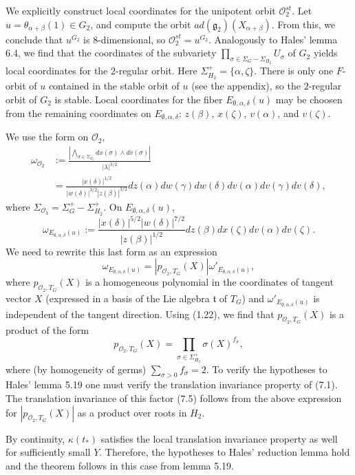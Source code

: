 \documentclass[12pt,letterpaper]{amsart}
\begin{document}
We explicitly construct
local coordinates for the unipotent orbit ${\mathcal O}_2^{st}$.
Let $u=\theta_{\alpha+\beta }(1)\in G_2$, and compute
the orbit $ad({\mathfrak g}_2)(X_{\alpha+\beta })$.
From this, we conclude that $u^{G_2}$
is 8-dimensional, so ${\mathcal O}_2^{st}=u^{G_2}$.
Analogously to Hales' lemma 6.4,
we find that the coordinates of the subvariety
$\prod_{\sigma\in \Sigma_G-\Sigma_{H_2}}U_\sigma$
of $G_2$ yields local coordinates for the $2$-regular orbit.
Here $\Sigma_{H_2}^+=\{\alpha,\zeta\}$.
There is only one $F$-orbit of $u$ contained in the stable orbit of $u$
(see the appendix), so the $2$-regular orbit of $G_2$ is stable.
Local coordinates for the fiber $E_{\emptyset,\alpha,\delta}(u)$
may be choosen from the remaining coordinates on
$E_{\emptyset,\alpha,\delta}$:  $z(\beta)$, $x(\zeta)$,
$v(\alpha)$, and $v(\zeta)$.

We use the form on ${\mathcal O}_2$,
\[
\begin{split}
\omega_{{\mathcal O}_2}
&:=\frac{|\bigwedge_{\sigma\in \Sigma_{{\mathcal O}_2}}dx(\sigma)\wedge dv(\sigma)|}{|\lambda|^{3/2}}\\
&=\frac{|x(\delta)|^{1/2}}{|w(\delta)|^{3/2}|z(\beta)|^{3/2}}
dz(\alpha)dw(\gamma)dw(\delta)dv(\alpha)dv(\gamma)dv(\delta),
\end{split}
\tag{7.3}
\]
where $\Sigma_{{\mathcal O}_3}=\Sigma_{G}^+ -\Sigma_{H_2}^+$.
On $E_{\emptyset,\alpha,\delta}(u)$,
\[
\omega_{E_{\emptyset,\alpha,\delta}(u)}:=
\frac{{|x(\delta)|^{5/2}}|w(\delta)|^{7/2}}{{|z(\beta)|^{1/2}}}
dz(\beta)dx(\zeta)dv(\alpha)dv(\zeta).
\tag{7.4}
\]
We need to rewrite this last form as an expression
\[
\omega_{E_{\emptyset,\alpha,\delta}(u)}=
|p_{{\mathcal O}_2,T_G}(X)|\omega'_{E_{\emptyset,\alpha,\delta}(u)},
\]
where $p_{{\mathcal O}_2,T_G}(X)$ is a homogeneous polynomial in the coordinates
of tangent vector $X$ (expressed in a basis of the Lie algebra
${\mathfrak t}$ of $T_G$) and $\omega'_{E_{\emptyset,\alpha,\delta}(u)}$
is independent of the tangent direction.
Using (1.22), we find that $p_{{\mathcal O}_2,T_G}(X)$ is a product of the form
\[
p_{{\mathcal O}_2,T_G}(X)=\prod_{\sigma \in \Sigma_{H_2}^+}\sigma(X)^{f_\sigma},
\tag{7.5}
\]
where (by homogeneity of germs)
$\sum_{\sigma >0}f_\sigma =2$. To verify the hypotheses to Hales'
lemma 5.19 one must verify the translation invariance property
of (7.1). The translation invariance of this factor (7.5)
follows from the above expression for
$|p_{{\mathcal O}_2,T_G}(X)|$ as a product over roots in $H_2$.

By continuity, $\kappa(t_*)$ satisfies the
local translation invariance property as well for sufficiently small $Y$.
Therefore, the hypotheses to Hales' reduction lemma hold and the
theorem follows in this case from lemma 5.19.
\end{document}
